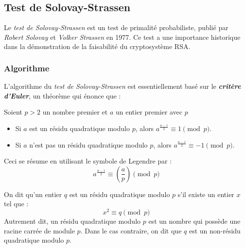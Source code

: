 \subsection{Test de Solovay-Strassen}

	Le \textit{test de Solovay-Strassen} est un test de primalité probabiliste, publié par \textit{Robert Solovay} et \textit{Volker Strassen} en 1977. Ce test a une importance historique dans la démonstration de la faisabilité du cryptosystème RSA.

	\subsubsection{Algorithme}
		L'algorithme du \textit{test de Solovay-Strassen} est essentiellement basé sur le \textit{\textbf{critère d'Euler}}, un théorème qui énonce que :
		\vspace{-1.5em}\begin{adjustwidth}{1.5cm}{1.5cm} 
		\begin{Th}
			\label{CritereEuler}
			Soient $p > 2$ un nombre premier et $a$ un entier premier avec $p$
			\begin{itemize}
				\item Si $a$ est un résidu quadratique modulo $p$, alors $a^{\frac{n-1}{2}} \equiv 1 \pmod p$.
				\item Si $a$ n'est pas un résidu quadratique modulo $p$, alors $a^{\frac{n-1}{2}} \equiv -1 \pmod p$.
			\end{itemize}
			Ceci se résume en utilisant le symbole de Legendre par :
			\[a^{\frac{n-1}{2}} \equiv \left ( \frac{a}{p} \right ) \pmod p\]
		\end{Th}
		\end{adjustwidth}\vspace{0.5em}
		
		\vspace{-1.5em}\begin{adjustwidth}{1.5cm}{1.5cm} 
		\begin{Def}
			\label{Residu}
			On dit qu'un entier $q$ est un résidu quadratique modulo $p$ s'il existe un entier $x$ tel que :
			\[x^{2} \equiv q \pmod p\]
			Autrement dit, un résidu quadratique modulo $p$ est un nombre qui possède une racine carrée de module $p$. Dans le cas contraire, on dit que $q$ est un non-résidu quadratique modulo $p$.
		\end{Def}
		\end{adjustwidth}\vspace{0.5em}
		
